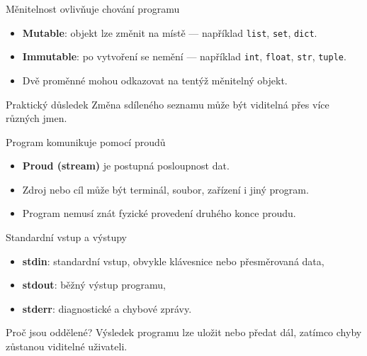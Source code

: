 \documentclass[aspectratio=169]{beamer}
\newcommand{\term}[1]{\textcolor{CodeBlue}{\textbf{#1}}}
\begin{document}
\begin{frame}{Měnitelnost ovlivňuje chování programu}
  \begin{itemize}
    \item \term{Mutable}: objekt lze změnit na místě --- například \texttt{list}, \texttt{set}, \texttt{dict}.
    \item \term{Immutable}: po vytvoření se nemění --- například \texttt{int}, \texttt{float}, \texttt{str}, \texttt{tuple}.
    \item Dvě proměnné mohou odkazovat na tentýž měnitelný objekt.
  \end{itemize}
  \begin{alertblock}{Praktický důsledek}
    Změna sdíleného seznamu může být viditelná přes více různých jmen.
  \end{alertblock}
\end{frame}

\begin{frame}{Program komunikuje pomocí proudů}
  \centering
  \vspace{7mm}
  \begin{itemize}
    \item \term{Proud (stream)} je postupná posloupnost dat.
    \item Zdroj nebo cíl může být terminál, soubor, zařízení i jiný program.
    \item Program nemusí znát fyzické provedení druhého konce proudu.
  \end{itemize}
\end{frame}

\begin{frame}{Standardní vstup a výstupy}
  \begin{itemize}
    \item \term{stdin}: standardní vstup, obvykle klávesnice nebo přesměrovaná data,
    \item \term{stdout}: běžný výstup programu,
    \item \term{stderr}: diagnostické a chybové zprávy.
  \end{itemize}
  \begin{block}{Proč jsou oddělené?}
    Výsledek programu lze uložit nebo předat dál, zatímco chyby zůstanou viditelné uživateli.
  \end{block}
\end{frame}
\end{document}
